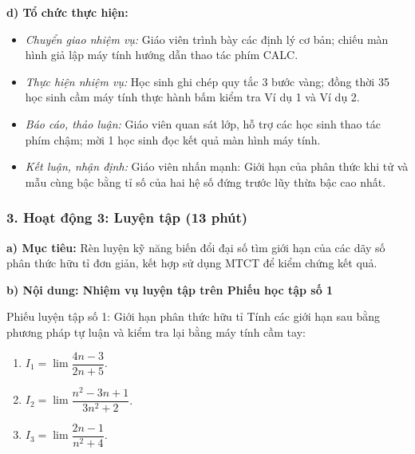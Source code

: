 \documentclass[12pt, a4paper]{article}
\begin{document}
\noindent \textbf{d) Tổ chức thực hiện:}
\begin{itemize}[leftmargin=0.8cm]
    \item \textit{Chuyển giao nhiệm vụ:} Giáo viên trình bày các định lý cơ bản; chiếu màn hình giả lập máy tính hướng dẫn thao tác phím CALC.
    \item \textit{Thực hiện nhiệm vụ:} Học sinh ghi chép quy tắc 3 bước vàng; đồng thời 35 học sinh cầm máy tính thực hành bấm kiểm tra Ví dụ 1 và Ví dụ 2.
    \item \textit{Báo cáo, thảo luận:} Giáo viên quan sát lớp, hỗ trợ các học sinh thao tác phím chậm; mời 1 học sinh đọc kết quả màn hình máy tính.
    \item \textit{Kết luận, nhận định:} Giáo viên nhấn mạnh: Giới hạn của phân thức khi tử và mẫu cùng bậc bằng tỉ số của hai hệ số đứng trước lũy thừa bậc cao nhất.
\end{itemize}

\subsubsection*{3. Hoạt động 3: Luyện tập (13 phút)}

\noindent \textbf{a) Mục tiêu:}
Rèn luyện kỹ năng biến đổi đại số tìm giới hạn của các dãy số phân thức hữu tỉ đơn giản, kết hợp sử dụng MTCT để kiểm chứng kết quả.

\noindent \textbf{b) Nội dung: Nhiệm vụ luyện tập trên Phiếu học tập số 1}
\begin{pedabox}{Phiếu luyện tập số 1: Giới hạn phân thức hữu tỉ}
Tính các giới hạn sau bằng phương pháp tự luận và kiểm tra lại bằng máy tính cầm tay:
\begin{enumerate}[leftmargin=0.6cm]
    \item $I_1 = \lim \dfrac{4n - 3}{2n + 5}$.
    \item $I_2 = \lim \dfrac{n^2 - 3n + 1}{3n^2 + 2}$.
    \item $I_3 = \lim \dfrac{2n - 1}{n^2 + 4}$.
\end{enumerate}
\end{pedabox}
\end{document}
